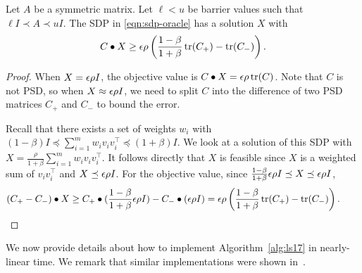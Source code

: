 \begin{lemma}
\label{lem:sdp-sol-exist}
Let $A$ be a symmetric matrix. Let $\ell < u$ be barrier values such that $\ell I \prec A \prec u I$.
The SDP in \eqref{eqn:sdp-oracle} has a solution $X$ with
\[
C \bullet X \ge \epsilon \rho \left(\frac{1-\beta}{1+\beta}\operatorname{tr}(C_+) - \operatorname{tr}(C_-)\right).
\]
\end{lemma}
\begin{proof}%
When $X = \epsilon \rho I$, the objective value is $C \bullet X = \epsilon \rho \operatorname{tr}(C)$.
Note that $C$ is not PSD, so when $X \approx \epsilon \rho I$, we need to split $C$ into the difference of two PSD matrices $C_+$ and $C_-$ to bound the error.

Recall that there exists a set of weights $w_i$ with $(1-\beta) I \preceq \sum_{i=1}^m w_i v_i v_i^\top \preceq (1+\beta)I$.
We look at a solution of this SDP with $X = \frac{\rho}{1+\beta} \sum_{i=1}^m w_i v_i v_i^\top$.
It follows directly that $X$ is feasible since $X$ is a weighted sum of $v_i v_i^\top$ and $X \preceq \epsilon \rho I$.
For the objective value, since $\frac{1-\beta}{1+\beta} \epsilon \rho I \preceq X \preceq \epsilon \rho I$,
\begin{equation*}
(C_+ - C_-) \bullet X
  \ge C_+ \bullet (\frac{1-\beta}{1+\beta} \eps \rho I) - C_- \bullet (\eps \rho I)
  = \eps\rho\left(\frac{1-\beta}{1+\beta} \tr(C_+) - \tr(C_-)\right). \tag*{\jmlrQED} %
\end{equation*}
\renewcommand{\jmlrQED}{}
\end{proof}

We now provide details about how to implement Algorithm~\ref{alg:ls17} in nearly-linear time.
We remark that similar implementations were shown in~\cite{AllenLO15, LeeS15, LeeS17}.

